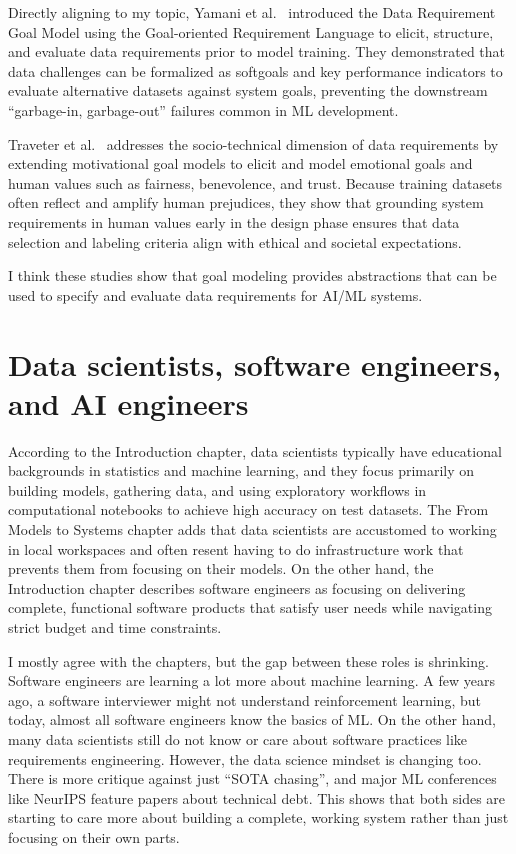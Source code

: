 Directly aligning to my topic, Yamani et al.~\cite{yamani2025data} introduced the Data Requirement Goal Model using the Goal-oriented Requirement Language to elicit, structure, and evaluate data requirements prior to model training. They demonstrated that data challenges can be formalized as softgoals and key performance indicators to evaluate alternative datasets against system goals, preventing the downstream ``garbage-in, garbage-out'' failures common in ML development.

Traveter et al.~\cite{taveter2025eliciting} addresses the socio-technical dimension of data requirements by extending motivational goal models to elicit and model emotional goals and human values such as fairness, benevolence, and trust. Because training datasets often reflect and amplify human prejudices, they show that grounding system requirements in human values early in the design phase ensures that data selection and labeling criteria align with ethical and societal expectations.

I think these studies show that goal modeling provides abstractions that can be used to specify and evaluate data requirements for AI/ML systems. 

\section{Data scientists, software engineers, and AI engineers}
According to the Introduction chapter, data scientists typically have educational backgrounds in statistics and machine learning, and they focus primarily on building models, gathering data, and using exploratory workflows in computational notebooks to achieve high accuracy on test datasets. The From Models to Systems chapter adds that data scientists are accustomed to working in local workspaces and often resent having to do infrastructure work that prevents them from focusing on their models. On the other hand, the Introduction chapter describes software engineers as focusing on delivering complete, functional software products that satisfy user needs while navigating strict budget and time constraints. 

I mostly agree with the chapters, but the gap between these roles is shrinking. Software engineers are learning a lot more about machine learning. A few years ago, a software interviewer might not understand reinforcement learning, but today, almost all software engineers know the basics of ML. On the other hand, many data scientists still do not know or care about software practices like requirements engineering. However, the data science mindset is changing too. There is more critique against just ``SOTA chasing'', and major ML conferences like NeurIPS feature papers about technical debt. This shows that both sides are starting to care more about building a complete, working system rather than just focusing on their own parts.

